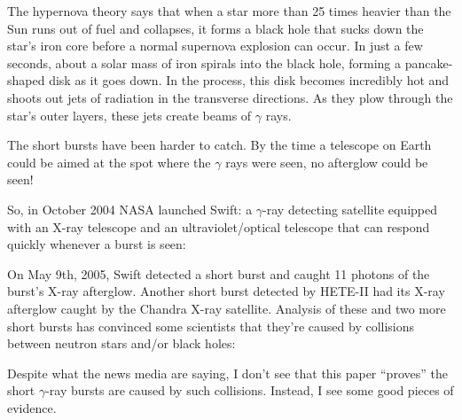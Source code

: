 \documentclass{article}
\def\tightlist{}
\renewcommand{\texttt}[1]{%
  \begingroup
  \ttfamily
  \begingroup\lccode`~=`/\lowercase{\endgroup\def~}{/\discretionary{}{}{}}%
  \begingroup\lccode`~=`[\lowercase{\endgroup\def~}{[\discretionary{}{}{}}%
  \begingroup\lccode`~=`.\lowercase{\endgroup\def~}{.\discretionary{}{}{}}%
  \catcode`/=\active\catcode`[=\active\catcode`.=\active
  \scantokens{#1\noexpand}%
  \endgroup
}
\begin{document}
The hypernova theory says that when a star more than 25 times heavier
than the Sun runs out of fuel and collapses, it forms a black hole that
sucks down the star's iron core before a normal supernova explosion can
occur. In just a few seconds, about a solar mass of iron spirals into
the black hole, forming a pancake-shaped disk as it goes down. In the
process, this disk becomes incredibly hot and shoots out jets of
radiation in the transverse directions. As they plow through the star's
outer layers, these jets create beams of \(\gamma\) rays.

The short bursts have been harder to catch. By the time a telescope on
Earth could be aimed at the spot where the \(\gamma\) rays were seen, no
afterglow could be seen!

So, in October 2004 NASA launched Swift: a \(\gamma\)-ray detecting
satellite equipped with an X-ray telescope and an ultraviolet/optical
telescope that can respond quickly whenever a burst is seen:


On May 9th, 2005, Swift detected a short burst and caught 11 photons of
the burst's X-ray afterglow. Another short burst detected by HETE-II had
its X-ray afterglow caught by the Chandra X-ray satellite. Analysis of
these and two more short bursts has convinced some scientists that
they're caused by collisions between neutron stars and/or black holes:


Despite what the news media are saying, I don't see that this paper
``proves'' the short \(\gamma\)-ray bursts are caused by such
collisions. Instead, I see some good pieces of evidence.
\end{document}
